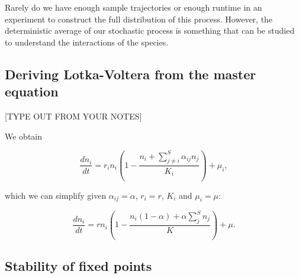\documentclass[11pt,a4paper,final]{iopart}
\begin{document}
Rarely do we have enough sample trajectories or enough runtime in an experiment to construct the full distribution of this process. However, the deterministic average of our stochastic process is something that can be studied to understand the interactions of the species. 

\subsection{Deriving Lotka-Voltera from the master equation}\label{LVder}

[TYPE OUT FROM YOUR NOTES]

We obtain

\begin{equation}\label{generalLVimmi}
\frac{d n_i}{dt} = r_i n_i\left( 1 - \frac{n_i + \sum_{j\neq i}^S \alpha_{ij} n_j}{K_i} \right) + \mu_i,
\end{equation}

which we can simplify given $\alpha_{ij}=\alpha$, $r_i=r$, $K_i$ and $\mu_i=\mu$:

\begin{equation}\label{simpleLVimmi}
\frac{d n_i}{dt} = r n_i\left( 1 - \frac{n_i(1-\alpha ) + \alpha \sum_{j}^S n_j }{K} \right) + \mu .
\end{equation}

\subsection{Stability of fixed points}
\end{document}
